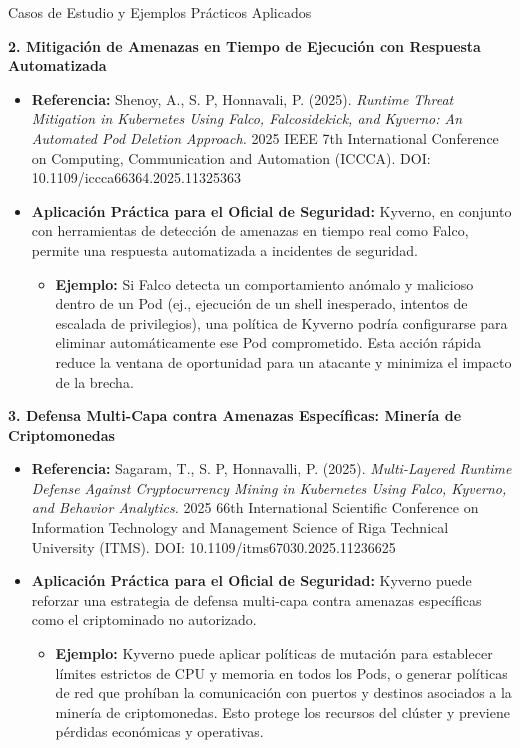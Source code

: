 \documentclass[aspectratio=169]{beamer}
\begin{document}
\begin{frame}{Casos de Estudio y Ejemplos Prácticos Aplicados}


\textbf{2. Mitigación de Amenazas en Tiempo de Ejecución con Respuesta Automatizada}
\begin{itemize}
  \item \textbf{Referencia:} Shenoy, A., S. P, Honnavali, P. (2025). \textit{Runtime Threat Mitigation in Kubernetes Using Falco, Falcosidekick, and Kyverno: An Automated Pod Deletion Approach.} 2025 IEEE 7th International Conference on Computing, Communication and Automation (ICCCA). DOI: 10.1109/iccca66364.2025.11325363
  \item \textbf{Aplicación Práctica para el Oficial de Seguridad:} Kyverno, en conjunto con herramientas de detección de amenazas en tiempo real como Falco, permite una respuesta automatizada a incidentes de seguridad.
  \begin{itemize}
    \item \textbf{Ejemplo:} Si Falco detecta un comportamiento anómalo y malicioso dentro de un Pod (ej., ejecución de un shell inesperado, intentos de escalada de privilegios), una política de Kyverno podría configurarse para eliminar automáticamente ese Pod comprometido. Esta acción rápida reduce la ventana de oportunidad para un atacante y minimiza el impacto de la brecha.
  \end{itemize}
\end{itemize}
\textbf{3. Defensa Multi-Capa contra Amenazas Específicas: Minería de Criptomonedas}
\begin{itemize}
  \item \textbf{Referencia:} Sagaram, T., S. P, Honnavalli, P. (2025). \textit{Multi-Layered Runtime Defense Against Cryptocurrency Mining in Kubernetes Using Falco, Kyverno, and Behavior Analytics.} 2025 66th International Scientific Conference on Information Technology and Management Science of Riga Technical University (ITMS). DOI: 10.1109/itms67030.2025.11236625
  \item \textbf{Aplicación Práctica para el Oficial de Seguridad:} Kyverno puede reforzar una estrategia de defensa multi-capa contra amenazas específicas como el criptominado no autorizado.
  \begin{itemize}
    \item \textbf{Ejemplo:} Kyverno puede aplicar políticas de mutación para establecer límites estrictos de CPU y memoria en todos los Pods, o generar políticas de red que prohíban la comunicación con puertos y destinos asociados a la minería de criptomonedas. Esto protege los recursos del clúster y previene pérdidas económicas y operativas.
  \end{itemize}
\end{itemize}
\end{frame}
\end{document}
